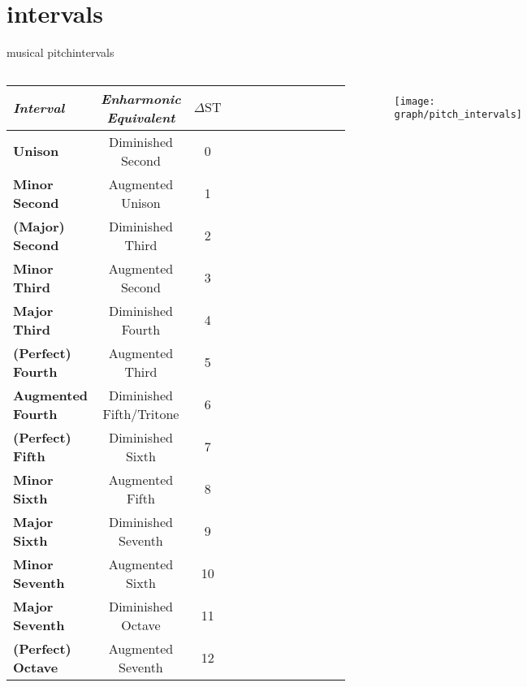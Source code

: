     \section{intervals}
        \begin{frame}{musical pitch}{intervals}
            \vspace{-8mm}
            \begin{columns}
            \begin{scriptsize}
                \begin{table}
                    \centering
                    \begin{tabular}{lccccccccccc} %
                        \\ \hline
                        \bf{\emph{Interval}}	 & \bf{\emph{Enharmonic Equivalent}}	 & \bf{\emph{$\Delta\mathrm{ST}$}}\\ 
                         \hline
                        \bf{Unison}	 & Diminished Second	 & 0\\
                        \bf{Minor Second}	 & Augmented Unison	 & 1\\
                        \bf{(Major) Second}	 & Diminished Third	 & 2\\
                        \bf{Minor Third}	 & Augmented Second	 & 3\\
                        \bf{Major Third}	 & Diminished Fourth	 & 4\\
                        \bf{(Perfect) Fourth}	 & Augmented Third	 & 5\\
                        \bf{Augmented Fourth}	 & Diminished Fifth/Tritone	 & 6\\
                        \bf{(Perfect) Fifth}	 & Diminished Sixth	 & 7\\
                        \bf{Minor Sixth}	 & Augmented Fifth	 & 8\\
                        \bf{Major Sixth}	 & Diminished Seventh	 & 9\\
                        \bf{Minor Seventh}	 & Augmented Sixth	 & 10\\
                        \bf{Major Seventh}	 & Diminished Octave	 & 11\\
                        \bf{(Perfect) Octave}	 & Augmented Seventh	 & 12\\
                    \end{tabular}
                \end{table}
            \end{scriptsize}
            \begin{figure}
                \texttt{[image: graph/pitch\_intervals]}
            \end{figure}
            \end{columns}
        \end{frame}


